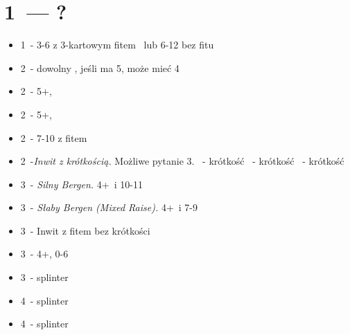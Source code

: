 \documentclass[12pt, a4paper]{article}
\begin{document}
    \section{1\spades\ --- ?}
    \begin{itemize}
        \item 1\nt\ - 3-6 z 3-kartowym fitem \spades\ lub 6-12 bez fitu \spades 
        \item 2\clubs\ - dowolny \gf, jeśli ma 5\clubs, może mieć 4\hearts 
        \item 2\diams\ - 5+\diams, \gf
        \item 2\hearts\ - 5+\hearts, \gf
        \item 2\spades\ - 7-10 z fitem \spades
        \item 2\nt\ -\emph{Inwit z krótkością.} Możliwe pytanie 3\clubs.
        \diams\ - krótkość \diams
        \hearts\ - krótkość \hearts
        \spades\ - krótkość \clubs 
        \item 3\clubs\ - \emph{Silny Bergen.} 4+\spades\ i 10-11
        \item 3\diams\ - \emph{Słaby Bergen (Mixed Raise).} 4+\spades\ i 7-9
        \item 3\hearts\ - Inwit z fitem bez krótkości
        \item 3\spades\ - 4+\spades, 0-6
        \item 3\nt\ - splinter \hearts\
        \item 4\clubs\ - splinter \clubs\
        \item 4\diams\ - splinter \diams\ 
    \end{itemize}
\end{document}
